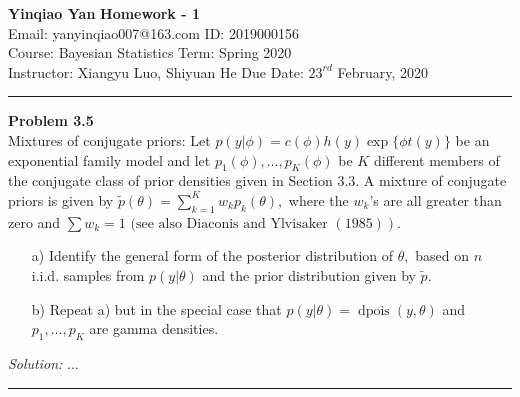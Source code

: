 \documentclass[a4paper, 11pt]{article}
\newenvironment{problem}[2][Problem]
    { \begin{mdframed}[backgroundcolor=gray!20] \textbf{#1 #2} \\}
    {  \end{mdframed}}
\newenvironment{solution}
    {\textit{Solution:}}
    {}
\begin{document}
\noindent
\large\textbf{Yinqiao Yan} \hfill \textbf{Homework - 1}   \\
Email: yanyinqiao007@163.com \hfill ID: 2019000156 \\
\normalsize Course: Bayesian Statistics \hfill Term: Spring 2020\\
Instructor: Xiangyu Luo, Shiyuan He \hfill Due Date: $23^{rd}$ February, 2020 \\
\noindent\rule{7in}{2.8pt}
\begin{problem}{3.5}
Mixtures of conjugate priors: Let $p(y | \phi)=c(\phi) h(y) \exp \{\phi t(y)\}$ be an exponential family model and let $p_{1}(\phi), \ldots, p_{K}(\phi)$ be $K$ different members of the conjugate class of prior densities given in Section 3.3. A mixture of conjugate priors is given by $\tilde{p}(\theta)=\sum_{k=1}^{K} w_{k} p_{k}(\theta),$ where the $w_{k}$'s are all greater than zero and $\left.\sum w_{k}=1 \text { (see also Diaconis and Ylvisaker }(1985)\right)$.
\begin{enumerate}[leftmargin=*, parsep=0pt,itemsep=0pt, topsep=0pt]
	\item [a)] Identify the general form of the posterior distribution of $\theta,$ based on $n$ i.i.d. samples from $p(y | \theta)$ and the prior distribution given by $\tilde{p}$.
	\item[b)] Repeat a) but in the special case that $p(y | \theta)=\operatorname{dpois}(y, \theta)$ and $p_{1}, \ldots, p_{K}$ are gamma densities.
\end{enumerate}

\end{problem}
\begin{solution}
...
\end{solution} 

\noindent\rule{7in}{2.8pt}

\end{document}
